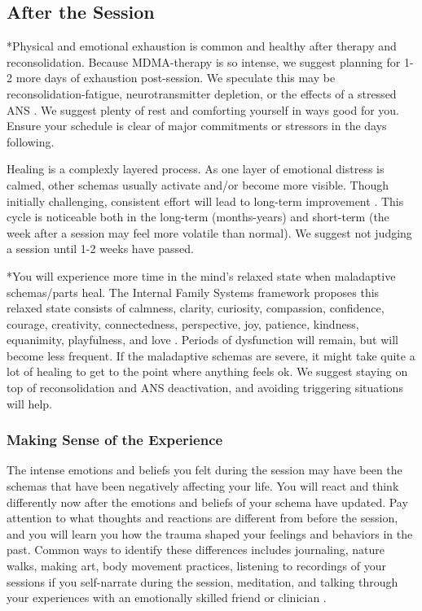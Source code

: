 \documentclass[12pt,letterpaper]{article}
\begin{document}
\subsection{After the Session}
\label{after}
*Physical and emotional exhaustion is common and healthy after therapy and reconsolidation. Because MDMA-therapy is so intense, we suggest planning for 1-2 more days of exhaustion post-session. We speculate this may be reconsolidation-fatigue, neurotransmitter depletion, or the effects of a stressed ANS \cite{razviPSIP}. We suggest plenty of rest and comforting yourself in ways good for you. Ensure your schedule is clear of major commitments or stressors in the days following. 

Healing is a complexly layered process. As one layer of emotional distress is calmed, other schemas usually activate and/or become more visible. Though initially challenging, consistent effort will lead to long-term improvement \cite{vanderKolkBody}. This cycle is noticeable both in the long-term (months-years) and short-term (the week after a session may feel more volatile than normal). We suggest not judging a session until 1-2 weeks have passed.

*You will experience more time in the mind's relaxed state when maladaptive schemas/parts heal. The Internal Family Systems framework proposes this relaxed state consists of calmness, clarity, curiosity, compassion, confidence, courage, creativity, connectedness, perspective, joy, patience, kindness, equanimity, playfulness, and love \cite{schwartzIFS}. Periods of dysfunction will remain, but will become less frequent. If the maladaptive schemas are severe, it might take quite a lot of healing to get to the point where anything feels ok. We suggest staying on top of reconsolidation and ANS deactivation, and avoiding triggering situations will help. 
\subsubsection{Making Sense of the Experience}
\label{sectionMakingSense}
The intense emotions and beliefs you felt during the session may have been the schemas that have been negatively affecting your life. You will react and think differently now after the emotions and beliefs of your schema have updated. Pay attention to what thoughts and reactions are different from before the session, and you will learn you how the trauma shaped your feelings and behaviors in the past. Common ways to identify these differences includes journaling, nature walks, making art, body movement practices, listening to recordings of your sessions if you self-narrate during the session, meditation, and talking through your experiences with an emotionally skilled friend or clinician \cite{mithoeferManual}.
\end{document}
